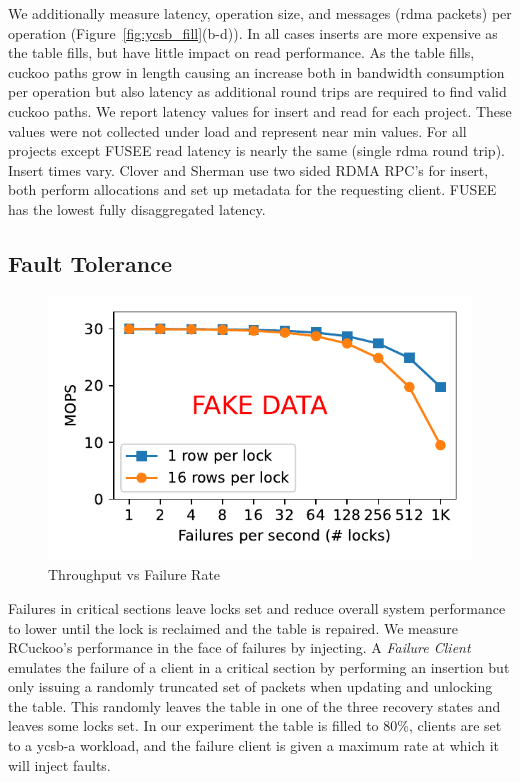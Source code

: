 We additionally measure latency, operation size, and
messages (rdma packets) per operation
(Figure~\ref{fig:ycsb_fill}(b-d)). In all cases inserts are
more expensive as the table fills, but have little impact on
read performance. As the table fills, cuckoo paths grow in
length causing an increase both in bandwidth consumption per
operation but also latency as additional round trips are
required to find valid cuckoo paths. We report latency
values for insert and read for each project. These values
were not collected under load and represent near min values.
For all projects except FUSEE read latency is nearly the
same (single rdma round trip). Insert times vary. Clover and
Sherman use two sided RDMA RPC's for insert, both perform
allocations and set up metadata for the requesting client.
FUSEE has the lowest fully disaggregated latency.

\subsection{Fault Tolerance}
\begin{figure}[ht]
    \includegraphics[width=0.99\linewidth]{fig/failure_throughput.pdf}
    \caption{Throughput vs Failure Rate}
    \label{fig:failure_throughput}
\end{figure}

Failures in critical sections leave locks set and reduce
overall system performance to lower until the lock is
reclaimed and the table is repaired. We measure RCuckoo's
performance in the face of failures by injecting. A
\textit{Failure Client} emulates the failure of a client in a
critical section by performing an insertion but only issuing
a randomly truncated set of packets when updating and
unlocking the table. This randomly leaves the table in one
of the three recovery states and leaves some locks set. In
our experiment the table is filled to 80\%, clients are set
to a ycsb-a workload, and the failure client is given a
maximum rate at which it will inject faults.

